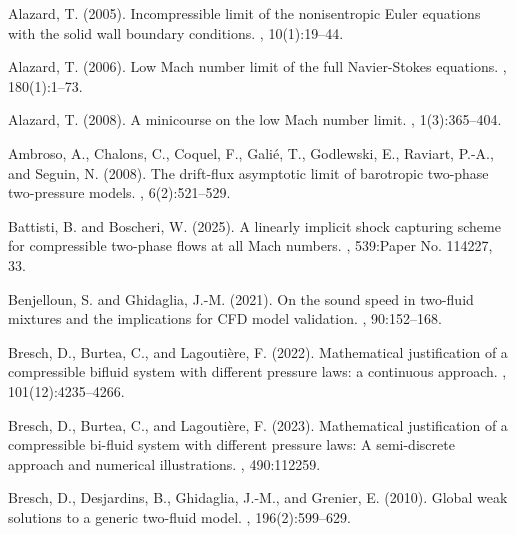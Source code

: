 \documentclass[11pt, twoside, a4paper]{article}
\theoremstyle{plain}
\theoremstyle{remark}
\numberwithin{equation}{section}
\begin{document}
\begin{thebibliography}{}

Alazard, T. (2005).
\newblock Incompressible limit of the nonisentropic {E}uler equations with the
  solid wall boundary conditions.
, 10(1):19--44.

Alazard, T. (2006).
\newblock Low {M}ach number limit of the full {N}avier-{S}tokes equations.
, 180(1):1--73.

Alazard, T. (2008).
\newblock A minicourse on the low {M}ach number limit.
, 1(3):365--404.

Ambroso, A., Chalons, C., Coquel, F., Gali\'e, T., Godlewski, E., Raviart,
  P.-A., and Seguin, N. (2008).
\newblock The drift-flux asymptotic limit of barotropic two-phase two-pressure
  models.
, 6(2):521--529.

Battisti, B. and Boscheri, W. (2025).
\newblock A linearly implicit shock capturing scheme for compressible two-phase
  flows at all {M}ach numbers.
, 539:Paper No. 114227, 33.

Benjelloun, S. and Ghidaglia, J.-M. (2021).
\newblock On the sound speed in two-fluid mixtures and the implications for
  {CFD} model validation.
, 90:152--168.

Bresch, D., Burtea, C., and Lagouti{\`e}re, F. (2022).
\newblock Mathematical justification of a compressible bifluid system with
  different pressure laws: a continuous approach.
, 101(12):4235--4266.

Bresch, D., Burtea, C., and Lagouti{\`e}re, F. (2023).
\newblock Mathematical justification of a compressible bi-fluid system with
  different pressure laws: {A} semi-discrete approach and numerical
  illustrations.
, 490:112259.

Bresch, D., Desjardins, B., Ghidaglia, J.-M., and Grenier, E. (2010).
\newblock Global weak solutions to a generic two-fluid model.
, 196(2):599--629.


\end{thebibliography}
\end{document}
